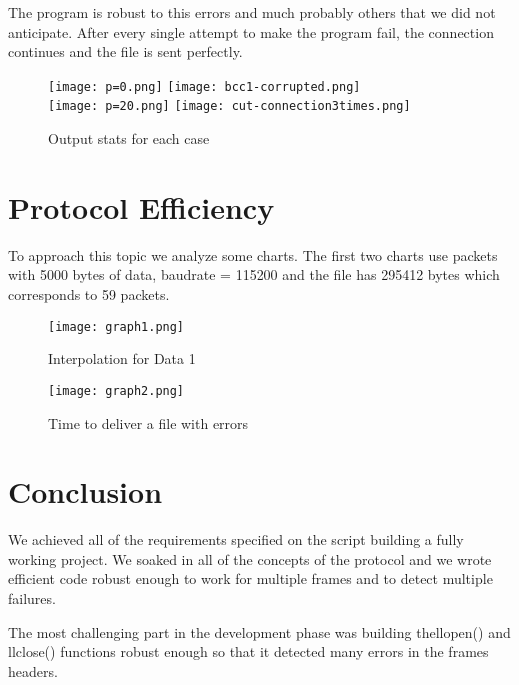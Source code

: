 \documentclass[main.tex]{subfiles}
\begin{document}
The program is robust to this errors and much probably others that we did not anticipate. After every single attempt to make the program fail, the connection continues and the file is sent perfectly.

\begin{figure}[htbp]
\centering
\texttt{[image: p=0.png]}
\texttt{[image: bcc1-corrupted.png]}\\
\medskip
\texttt{[image: p=20.png]}
\texttt{[image: cut-connection3times.png]}
\caption{Output stats for each case}
\label{fig:example}
\end{figure}

\section{Protocol Efficiency}
\label{sec:pefficiency}

To approach this topic we analyze some charts. The first two charts use packets with 5000 bytes of data, baudrate = 115200 and the file has 295412 bytes which corresponds to 59 packets. 

\begin{figure}[htbp]
\begin{minipage}{0.48\textwidth}
\centering
\texttt{[image: graph1.png]}
\caption{Interpolation for Data 1}
\label{Fig:Data1}
\end{minipage}\hfill
\begin{minipage}{0.48\textwidth}
\centering
\texttt{[image: graph2.png]}
\caption{Time to deliver a file with errors}
\label{Fig:Data2}
\end{minipage}
\end{figure}

\section{Conclusion}
\label{sec:conclusion}

We achieved all of the requirements specified on the script building a fully working project. We soaked in all of the concepts of the protocol and we wrote efficient code robust enough to work for multiple frames and to detect multiple failures.

The most challenging part in the development phase was building thellopen() and llclose() functions robust enough so that it detected many errors in the frames headers.
\end{document}
